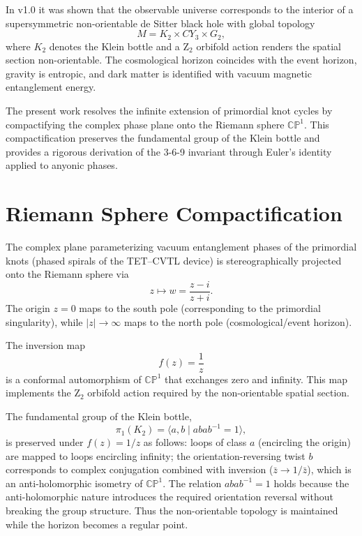 \documentclass[11pt,a4paper]{article}
\begin{document}
In v1.0 it was shown that the observable universe corresponds to the interior of a supersymmetric non-orientable de Sitter black hole with global topology
\begin{equation}
M = K_2 \times CY_3 \times G_2,
\end{equation}
where $K_2$ denotes the Klein bottle and a Z$_2$ orbifold action renders the spatial section non-orientable. The cosmological horizon coincides with the event horizon, gravity is entropic, and dark matter is identified with vacuum magnetic entanglement energy.

The present work resolves the infinite extension of primordial knot cycles by compactifying the complex phase plane onto the Riemann sphere $\mathbb{CP}^1$. This compactification preserves the fundamental group of the Klein bottle and provides a rigorous derivation of the 3-6-9 invariant through Euler's identity applied to anyonic phases.

\section{Riemann Sphere Compactification}

The complex plane parameterizing vacuum entanglement phases of the primordial knots (phased spirals of the TET--CVTL device) is stereographically projected onto the Riemann sphere via
\begin{equation}
z \mapsto w = \frac{z - i}{z + i}.
\end{equation}
The origin $z = 0$ maps to the south pole (corresponding to the primordial singularity), while $|z| \to \infty$ maps to the north pole (cosmological/event horizon).

The inversion map
\begin{equation}
f(z) = \frac{1}{z}
\end{equation}
is a conformal automorphism of $\mathbb{CP}^1$ that exchanges zero and infinity. This map implements the Z$_2$ orbifold action required by the non-orientable spatial section.

The fundamental group of the Klein bottle,
\begin{equation}
\pi_1(K_2) = \langle a, b \mid a b a b^{-1} = 1 \rangle,
\end{equation}
is preserved under $f(z) = 1/z$ as follows: loops of class $a$ (encircling the origin) are mapped to loops encircling infinity; the orientation-reversing twist $b$ corresponds to complex conjugation combined with inversion ($\bar{z} \to 1/\bar{z}$), which is an anti-holomorphic isometry of $\mathbb{CP}^1$. The relation $a b a b^{-1} = 1$ holds because the anti-holomorphic nature introduces the required orientation reversal without breaking the group structure. Thus the non-orientable topology is maintained while the horizon becomes a regular point.
\end{document}

